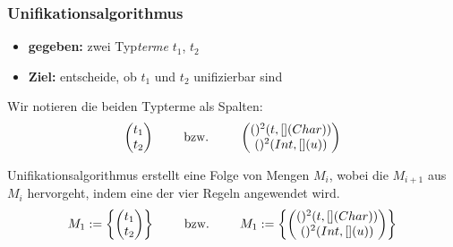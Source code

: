 \documentclass{beamer}
\begin{document}
\begin{frame}\frametitle{Unifikationsalgorithmus}
	\begin{itemize}
		\item \textbf{gegeben:} zwei Typ\textit{terme} $t_1$, $t_2$ 
		\item \textbf{Ziel:} entscheide, ob $t_1$ und $t_2$ unifizierbar sind
	\end{itemize}
	
	Wir notieren die beiden Typterme als Spalten:
	\begin{equation*}
		\begin{pmatrix}
			t_1 \\ t_2
		\end{pmatrix} 
		\qquad \text{ bzw. } \qquad 
		\begin{pmatrix}
			()^2(t, [](Char)) \\ ()^2(Int, [](u))
		\end{pmatrix} 
	\end{equation*}
	
	Unifikationsalgorithmus erstellt eine Folge von Mengen $M_i$, wobei die $M_{i+1}$ aus $M_i$ hervorgeht, indem eine der vier Regeln angewendet wird.
	\begin{equation*}
		M_1 \mathrel{:=} \left\{ \begin{pmatrix}
			t_1 \\ t_2
		\end{pmatrix} \right\}
		\qquad \text{ bzw. } \qquad 
		M_1 \mathrel{:=} \left\{ \begin{pmatrix}
			()^2(t, [](Char)) \\ ()^2(Int, [](u))
		\end{pmatrix} \right\}
	\end{equation*}
\end{frame}
\end{document}
